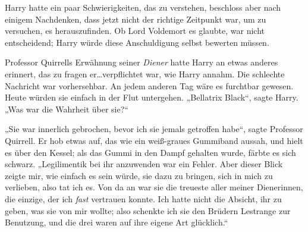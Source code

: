Harry hatte ein paar Schwierigkeiten, das zu verstehen, beschloss aber nach einigem Nachdenken, dass jetzt nicht der richtige Zeitpunkt war, um zu versuchen, es herauszufinden. Ob Lord Voldemort es glaubte, war nicht entscheidend; Harry würde diese Anschuldigung selbst bewerten müssen.

Professor Quirrells Erwähnung seiner \emph{Diener} hatte Harry an etwas anderes erinnert, das zu fragen er…verpflichtet war, wie Harry annahm. Die schlechte Nachricht war vorhersehbar. An jedem anderen Tag wäre es furchtbar gewesen. Heute würden sie einfach in der Flut untergehen.
„Bellatrix Black“, sagte Harry. „Was war die Wahrheit über sie?“

„Sie war innerlich gebrochen, bevor ich sie jemals getroffen habe“, sagte Professor Quirrell. Er hob etwas auf, das wie ein weiß-graues Gummiband aussah, und hielt es über den Kessel; als das Gummi in den Dampf gehalten wurde, färbte es sich schwarz.
„Legilimentik bei ihr anzuwenden war ein Fehler. Aber dieser Blick zeigte mir, wie einfach es sein würde, sie dazu zu bringen, sich in mich zu verlieben, also tat ich es. Von da an war sie die treueste aller meiner Dienerinnen, die einzige, der ich \emph{fast} vertrauen konnte. Ich hatte nicht die Absicht, ihr zu geben, was sie von mir wollte; also schenkte ich sie den Brüdern Lestrange zur Benutzung, und die drei waren auf ihre eigene Art glücklich.“


